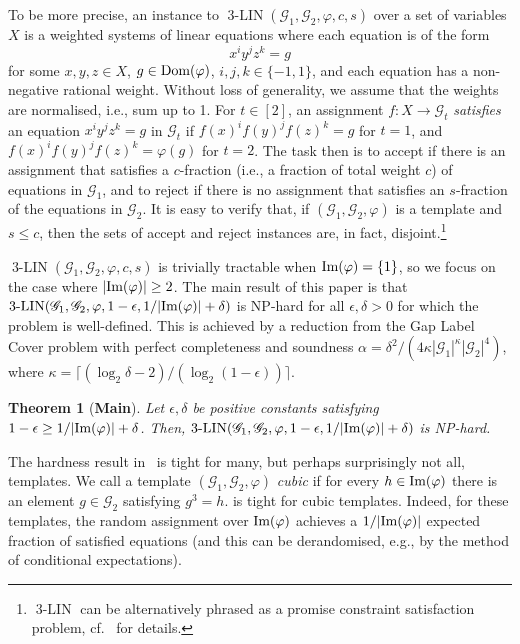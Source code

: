 \documentclass[a4paper,11pt]{article}
\newtheorem{theorem}{Theorem}[section]
\theoremstyle{definition}
\newcommand{\gr}{\mathscr{G}}
\newcommand{\im}{\textnormal{Im}}
\newcommand{\dom}{\textnormal{Dom}}
\newcommand{\groupid}{1}
\newcommand{\eq}{\ensuremath{\operatorname{3-LIN}}}
\begin{document}
To be more precise, an instance to  $\eq(\gr_1, \gr_2, \varphi,c,s)$ over a set of variables $X$ is a weighted systems of linear equations where each equation is of the form \[x^i y^j z^k = g\] for some $x,y,z \in X$, $g \in \dom(\varphi)$,  $i,j,k \in \{-1,1\}$, and each equation has a non-negative rational weight. Without loss of generality, we assume that the weights are normalised, i.e., sum up to 1.
%
For $t \in [2]$, an assignment $f:X\to \gr_t$ \emph{satisfies} an equation  $x^i y^j z^k = g$ in $\gr_t$ if $f(x)^i f(y)^j f(z)^k = g$ for $t=1$, and $f(x)^i f(y)^j f(z)^k = \varphi(g)$ for $t=2$.
The task then is to accept if there is an assignment that satisfies a $c$-fraction (i.e., a fraction of total weight $c$) of equations in $\gr_1$, and to reject if there is no assignment that satisfies an $s$-fraction of the equations in $\gr_2$. It is easy to verify that, if $(\gr_1,\gr_2, \varphi)$ is a template and $s \leq c$, then the sets of accept and reject instances are, in fact, disjoint.\footnote{$\eq$ can be alternatively phrased as a promise constraint satisfaction problem, cf.~ for details.}




$\eq(\gr_1,\gr_2,\varphi,c,s)$ is trivially tractable when $\im(\varphi)=\{\groupid\}$, so we focus on the case where $|\im(\varphi)|\geq 2$.
The main result of this paper is that $\eq(\gr_1,\gr_2,\varphi,1-\epsilon,1/|\im(\varphi)|+\delta)$ is NP-hard for all $\epsilon, \delta>0$ for which the problem is well-defined. This is achieved by a reduction from the Gap Label Cover problem with perfect completeness and soundness $\alpha=\delta^2/(4\kappa|\gr_1|^\kappa|\gr_2|^{4})$, where $\kappa=\lceil(\log_2\delta -2)/(\log_2(1-\epsilon))\rceil$. 
\begin{theorem}[\textbf{Main}]
\label{th:main}
     Let $\epsilon, \delta$ be positive constants satisfying $1-\epsilon
     \geq1/|\im(\varphi)|+\delta$. Then, $\eq(\gr_1,\gr_2,\varphi,1-\epsilon,1/|\im(\varphi)|+\delta)$ is NP-hard.
\end{theorem}
%
The hardness result in~ is tight for many, but perhaps surprisingly not all, templates. 
%
We call a template $(\gr_1,\gr_2, \varphi)$
\emph{cubic} if for every $h\in \im(\varphi)$ there is an element $g\in \gr_2$ satisfying $g^3=h$.
%
 is tight for cubic templates. Indeed, for these templates, the random assignment over $\im(\varphi)$ achieves a $1/|\im(\varphi)|$ expected
fraction of satisfied equations (and this can be derandomised, e.g., by the
method of conditional expectations). \par
\end{document}
